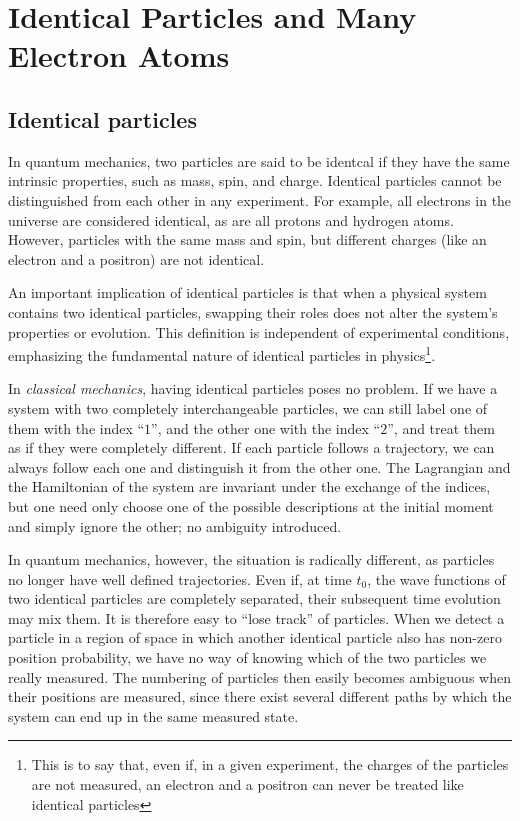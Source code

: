 \section{Identical Particles and Many Electron Atoms}

\subsection{Identical particles}

In quantum mechanics, two particles are said to be identcal if they have the same intrinsic properties, such as mass, spin, and charge. Identical particles cannot be distinguished from each other in any experiment. For example, all electrons in the universe are considered identical, as are all protons and hydrogen atoms. However, particles with the same mass and spin, but different charges (like an electron and a positron) are not identical.

An important implication of identical particles is that when a physical system contains two identical particles, swapping their roles does not alter the system's properties or evolution. This definition is independent of experimental conditions, emphasizing the fundamental nature of identical particles in physics\footnote{This is to say that, even if, in a given experiment, the charges of the particles are not measured, an electron and a positron can never be treated like identical particles}.

In \textit{classical mechanics}, having identical particles poses no problem. If we have a system with two completely interchangeable particles, we can still label one of them with the index ``$1$'', and the other one with the index ``$2$'', and treat them as if they were completely different. If each particle follows a trajectory, we can always follow each one and distinguish it from the other one. The Lagrangian and the Hamiltonian of the system are invariant under the exchange of the indices, but one need only choose one of the possible descriptions at the initial moment and simply ignore the other; no ambiguity introduced.

In quantum mechanics, however, the situation is radically different, as particles no longer have well defined trajectories. Even if, at time $t_0$, the wave functions of two identical particles are completely separated, their subsequent time evolution may mix them. It is therefore easy to ``lose track'' of particles. When we detect a particle in a region of space in which another identical particle also has non-zero position probability, we have no way of knowing which of the two particles we really measured. The numbering of particles then easily becomes ambiguous when their positions are measured, since there exist several different paths by which the system can end up in the same measured state. 

